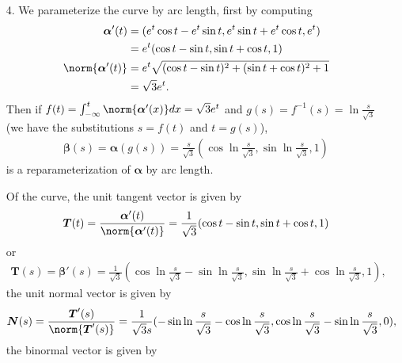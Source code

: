 \documentclass[a4paper,12pt]{article}
\newcommand{\bs}{\boldsymbol}
\theoremstyle{remark}
\begin{document}
\begin{enumerate}
    \item[4.]
        We parameterize the curve by arc length, first by computing
        \begin{align*}
            \bs{\alpha}'(t) &= (e^t \cos t - e^t \sin t, e^t \sin t + e^t \cos t, e^t) \\
            &= e^t(\cos t - \sin t, \sin t + \cos t, 1) \\
            \norm{\bs{\alpha}'(t)} &= e^t \sqrt{(\cos t - \sin t)^2 + (\sin t + \cos t)^2 + 1} \\
            &= \sqrt{3}e^t.
        \end{align*}
        Then if $f(t) = \int_{-\infty}^t \norm{\bs{\alpha}'(x)} dx = \sqrt{3} e^t$ and $g(s) = f^{-1}(s) = \ln \frac{s}{\sqrt{3}}$ (we have the substitutions $s = f(t)$ and $t = g(s)$),
        \begin{align*}
            \bs{\beta}(s) = \bs{\alpha}(g(s)) = \frac{s}{\sqrt{3}} (\cos\ln\frac{s}{\sqrt{3}}, \sin\ln\frac{s}{\sqrt{3}}, 1)
        \end{align*}
        is a reparameterization of $\bs{\alpha}$ by arc length. \par
        Of the curve, the unit tangent vector is given by
        \begin{align*}
            \bs{T}(t) = \frac{\bs{\alpha}'(t)}{\norm{\bs{\alpha}'(t)}} = \frac{1}{\sqrt{3}} (\cos t - \sin t, \sin t + \cos t, 1)
        \end{align*}
        or
        \begin{align*}
            \bs{T}(s) = \bs{\beta}'(s) = \frac{1}{\sqrt{3}} (\cos\ln\frac{s}{\sqrt{3}} - \sin\ln\frac{s}{\sqrt{3}}, \sin\ln\frac{s}{\sqrt{3}} + \cos\ln\frac{s}{\sqrt{3}}, 1),
        \end{align*}
        the unit normal vector is given by
        \begin{align*}
            \bs{N}(s) = \frac{\bs{T}'(s)}{\norm{\bs{T}'(s)}} = \frac{1}{\sqrt{3}s} (-\sin\ln\frac{s}{\sqrt{3}} - \cos\ln\frac{s}{\sqrt{3}}, \cos\ln\frac{s}{\sqrt{3}} - \sin\ln\frac{s}{\sqrt{3}}, 0),
        \end{align*}
        the binormal vector is given by
        \begin{align*}

\end{align*}
\end{enumerate}
\end{document}

